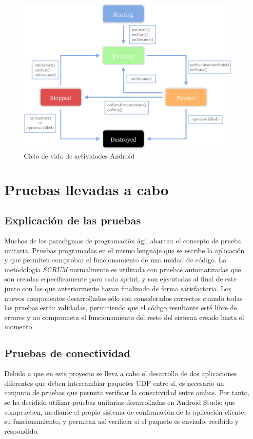 \documentclass[12pt]{article}
\begin{document}
        \begin{figure}[h!]
            \centering
                \includegraphics[scale=0.7]{android_lifecycle.eps}
                \caption{Ciclo de vida de actividades Android}
                \label{fig:android_lifecycle}
        \end{figure}

\section{Pruebas llevadas a cabo}
    \subsection{Explicación de las pruebas}
    Muchos de los paradigmas de programación ágil abarcan el concepto de prueba unitaria. Pruebas programadas en el mismo lenguaje que se escribe la aplicación y que permiten comprobar el funcionamiento de una unidad de código. La metodología \textit{SCRUM} normalmente es utilizada con pruebas automatizadas que son creadas específicamente para cada sprint, y son ejecutadas al final de este junto con las que anteriormente hayan finalizado de forma satisfactoria. Los nuevos componentes desarrollados sólo son considerados correctos cuando todas las pruebas están validadas, permitiendo que el código resultante esté libre de errores y no comprometa el funcionamiento del resto del sistema creado hasta el momento. 

    \subsection{Pruebas de conectividad}
    Debido a que en este proyecto se lleva a cabo el desarrollo de dos aplicaciones diferentes que deben intercambiar paquetes UDP entre sí, es necesario un conjunto de pruebas que permita verificar la conectividad entre ambas. Por tanto, se ha decidido utilizar pruebas unitarias desarrolladas en Android Studio que comprueben, mediante el propio sistema de confirmación de la aplicación cliente, su funcionamiento, y permitan así verificar si el paquete es enviado, recibido y respondido.
\end{document}
